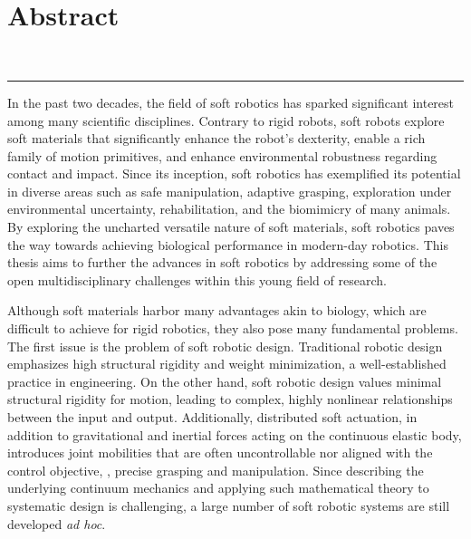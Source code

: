 \chapter*{\vspace{-30mm}\\ \huge{Abstract}} %
\vspace{-0mm}
\begin{center}
\textbf{{\large \maintitle} \\[0.05em]
}
\rule{\textwidth}{.75pt}
\end{center} 

\vspace{-2mm}
In the past two decades, the field of soft robotics has sparked significant interest among many scientific disciplines. Contrary to rigid robots, soft robots explore soft materials that significantly enhance the robot's dexterity, enable a rich family of motion primitives, and enhance environmental robustness regarding contact and impact. Since its inception, soft robotics has exemplified its potential in diverse areas such as safe manipulation, adaptive grasping, exploration under environmental uncertainty, rehabilitation, and the biomimicry of many animals. By exploring the uncharted versatile nature of soft materials, soft robotics paves the way towards achieving biological performance in modern-day robotics. This thesis aims to further the advances in soft robotics by addressing some of the open multidisciplinary challenges within this young field of research.

Although soft materials harbor many advantages akin to biology, which are difficult to achieve for rigid robotics, they also pose many fundamental problems. The first issue is the problem of soft robotic design. Traditional robotic design emphasizes high structural rigidity and weight minimization, a well-established practice in engineering. On the other hand, soft robotic design values minimal structural rigidity for motion, leading to complex, highly nonlinear relationships between the input and output. Additionally, distributed soft actuation, in addition to gravitational and inertial forces acting on the continuous elastic body, introduces joint mobilities that are often uncontrollable nor aligned with the control objective, \eg, precise grasping and manipulation. Since describing the underlying continuum mechanics and applying such mathematical theory to systematic design is challenging, a large number of soft robotic systems are still developed \emph{ad hoc}.

